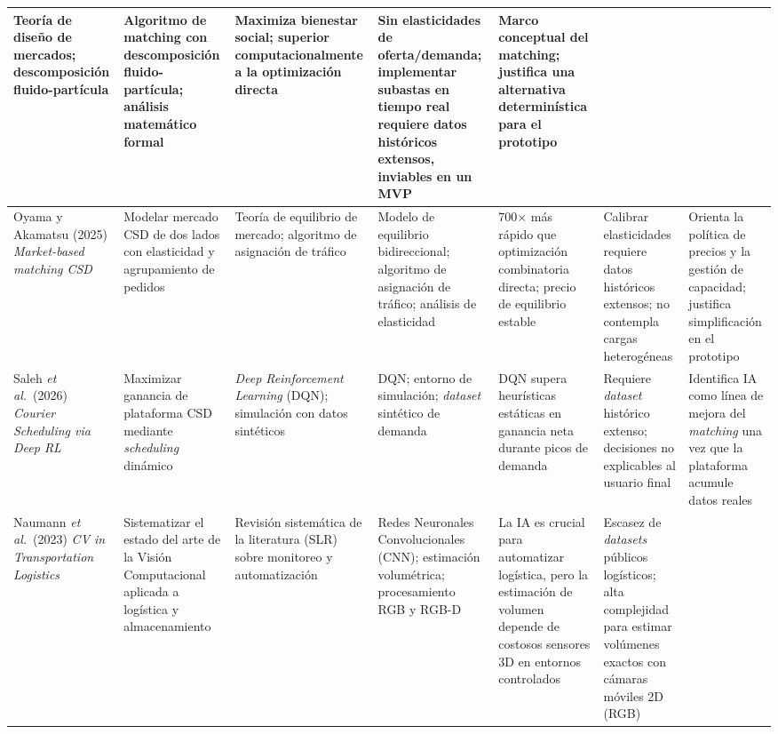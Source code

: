 \begin{table}[H]
{\begin{tabular}{p{2.3cm}p{2.6cm}p{2.3cm}p{2.5cm}p{3.0cm}p{2.5cm}p{3.0cm}}
        Teoría de diseño de mercados; descomposición fluido-partícula &
        Algoritmo de matching con descomposición fluido-partícula; análisis matemático formal &
        Maximiza bienestar social; superior computacionalmente a la optimización directa &
        Sin elasticidades de oferta/demanda; implementar subastas en tiempo real requiere datos históricos extensos, inviables en un MVP &
        Marco conceptual del matching; justifica una alternativa determinística para el prototipo \\
        \midrule
        Oyama y Akamatsu (2025) \newline \emph{Market-based matching CSD} &
        Modelar mercado CSD de dos lados con elasticidad y agrupamiento de pedidos &
        Teoría de equilibrio de mercado; algoritmo de asignación de tráfico &
        Modelo de equilibrio bidireccional; algoritmo de asignación de tráfico; análisis de elasticidad &
        700$\times$ más rápido que optimización combinatoria directa; precio de equilibrio estable &
        Calibrar elasticidades requiere datos históricos extensos; no contempla cargas heterogéneas &
        Orienta la política de precios y la gestión de capacidad; justifica simplificación en el prototipo \\
        \midrule
        Saleh \textit{et al.}\ (2026) \newline \emph{Courier Scheduling via Deep RL} &
        Maximizar ganancia de plataforma CSD mediante \emph{scheduling} dinámico &
        \emph{Deep Reinforcement Learning} (DQN); simulación con datos sintéticos &
        DQN; entorno de simulación; \emph{dataset} sintético de demanda &
        DQN supera heurísticas estáticas en ganancia neta durante picos de demanda &
        Requiere \emph{dataset} histórico extenso; decisiones no explicables al usuario final &
        Identifica IA como línea de mejora del \emph{matching} una vez que la plataforma acumule datos reales \\
        \midrule
        Naumann \textit{et al.}\ (2023) \newline \emph{CV in Transportation Logistics} &
        Sistematizar el estado del arte de la Visión Computacional aplicada a logística y almacenamiento &
        Revisión sistemática de la literatura (SLR) sobre monitoreo y automatización &
        Redes Neuronales Convolucionales (CNN); estimación volumétrica; procesamiento RGB y RGB-D &
        La IA es crucial para automatizar logística, pero la estimación de volumen depende de costosos sensores 3D en entornos controlados &
        Escasez de \emph{datasets} públicos logísticos; alta complejidad para estimar volúmenes exactos con cámaras móviles 2D (RGB) &

\end{tabular}}
\end{table}

